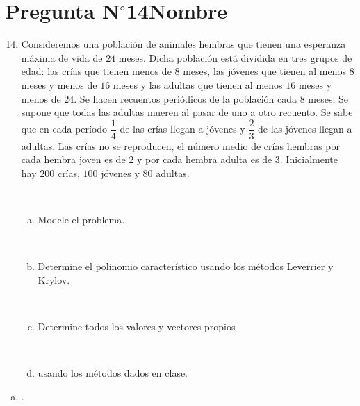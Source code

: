 \section{Pregunta N$^{\circ}$14\qquad Nombre}

\begin{frame}
	\begin{enumerate}\setcounter{enumi}{13}
		\item

		      Consideremos una población de animales hembras que tienen
		      una esperanza máxima de vida de $24$ meses.
		      Dicha población está dividida en tres grupos de edad: las
		      crías que tienen menos de $8$ meses, las jóvenes que tienen
		      al menos $8$ meses y menos de $16$ meses y las adultas que
		      tienen al menos $16$ meses y menos de $24$.
		      Se hacen recuentos periódicos de la población cada $8$ meses.
		      Se supone que todas las adultas mueren al pasar de uno a
		      otro recuento.
		      Se sabe que en cada período $\dfrac{1}{4}$ de las crías
		      llegan a jóvenes y $\dfrac{2}{3}$ de las jóvenes llegan a adultas.
		      Las crías no se reproducen, el número medio de crías
		      hembras por cada hembra joven es de $2$ y por cada hembra
		      adulta es de $3$.
		      Inicialmente hay $200$ crías, $100$ jóvenes y $80$ adultas.

		      \

		      \begin{enumerate}[a)]
			      \item

			            Modele el problema.

			            \

			      \item


			            Determine el polinomio característico usando los
			            métodos Leverrier y Krylov.

			            \

			      \item

			            Determine todos los valores y vectores propios

			            \

			      \item


			            usando los métodos dados en clase.
		      \end{enumerate}
	\end{enumerate}

	\begin{solution}
		\begin{enumerate}[a)]
			\item

			      .
		\end{enumerate}
	\end{solution}
\end{frame}
